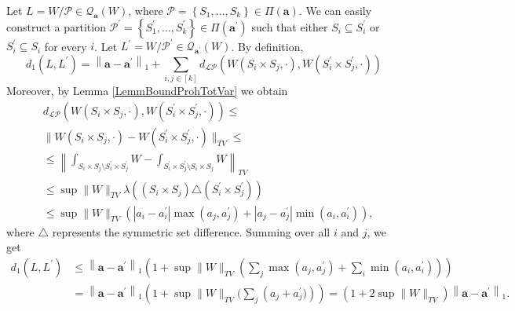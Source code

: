 \documentclass[11pt]{article}
\begin{document}
\proof Let $L=W / \mathcal{P} \in \mathcal{Q}_{\mathbf{a}}(W)$, where $\mathcal{P}=\left\{S_1, \ldots, S_k\right\} \in \Pi(\mathbf{a})$. We can easily construct a partition $\mathcal{P}^{\prime}=\left\{S_1^{\prime}, \ldots, S_k^{\prime}\right\} \in \Pi\left(\mathbf{a}^{\prime}\right)$ such that either $S_i \subseteq S_i^{\prime}$ or $S_i^{\prime} \subseteq S_i$ for every $i$. Let $L^{\prime}=W / \mathcal{P}^{\prime} \in \mathcal{Q}_{\mathbf{a}^{\prime}}(W)$. By definition,
$$
d_1\left(L, L^{\prime}\right)=\left\|\mathbf{a}-\mathbf{a}^{\prime}\right\|_1+\sum_{i, j \in[k]}d_{\mathcal{LP}}(W(S_i \times S_j,\cdot),W(S_i^{\prime} \times S_j^{\prime},\cdot))
$$
Moreover, by Lemma \ref{LemmBoundProhTotVar} we obtain
$$
\begin{aligned}
&d_{\mathcal{LP}}(W(S_i \times S_j,\cdot),W(S_i^{\prime} \times S_j^{\prime},\cdot))\leq 
\\
&\|W(S_i \times S_j,\cdot)-W(S_i^{\prime} \times S_j^{\prime},\cdot)\|_{TV}\leq \\ 
&\leq \left\|\int_{S_i \times S_j\setminus S_i^{\prime} \times S_j^{\prime}} W-\int_{S_i^{\prime} \times S_j^{\prime}\setminus S_i \times S_j} W\right \|_{TV} \\
& \leq \sup \|W\|_{TV} \lambda\left(\left(S_i \times S_j \right) \triangle\left(S_i^{\prime} \times S_j^{\prime}\right)\right) \\
& \leq \sup \|W\|_{TV} (\left|a_i-a_i^{\prime}\right| \max \left(a_j, a_j^{\prime}\right)+\left|a_j-a_j^{\prime}\right| \min \left(a_i, a_i^{\prime}\right)) ,
\end{aligned}
$$
where $\triangle$ represents the symmetric set difference.
Summing over all $i$ and $j$, we get
$$
\begin{aligned}
d_1\left(L, L^{\prime}\right) & \leq\left\|\mathbf{a}-\mathbf{a}^{\prime}\right\|_1\left(1+\sup\|W\|_{TV}(\sum_j \max \left(a_j, a_j^{\prime}\right)+\sum_i \min \left(a_i, a_i^{\prime}\right))\right) \\
& =\left\|\mathbf{a}-\mathbf{a}^{\prime}\right\|_1\left(1+\sup\|W\|_{TV}(\sum_j\left(a_j+a_j^{\prime})\right)\right)=(1+2\sup\|W\|_{TV})\left\|\mathbf{a}-\mathbf{a}^{\prime}\right\|_1 .
\end{aligned}
$$
\end{document}
